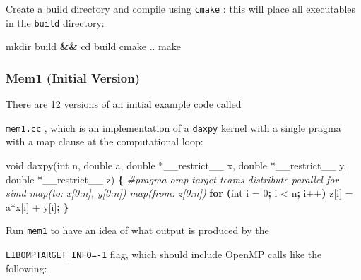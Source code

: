 \documentclass[
]{article}
\let\oldtexttt\texttt
\renewcommand{\texttt}[1]{
  \colorbox{Light}{\oldtexttt{#1}}
}
\newenvironment{Shaded}{}{}
\newcommand{\BuiltInTok}[1]{#1}
\newcommand{\CommentTok}[1]{\textcolor[rgb]{0.38,0.63,0.69}{\textit{#1}}}
\newcommand{\ExtensionTok}[1]{#1}
\newcommand{\FunctionTok}[1]{\textcolor[rgb]{0.02,0.16,0.49}{#1}}
\newcommand{\KeywordTok}[1]{\textcolor[rgb]{0.00,0.44,0.13}{\textbf{#1}}}
\newcommand{\NormalTok}[1]{#1}
\newcommand{\OperatorTok}[1]{\textcolor[rgb]{0.40,0.40,0.40}{#1}}
\begin{document}
Create a build directory and compile using \texttt{cmake}: this will
place all executables in the \texttt{build} directory:

\begin{Shaded}
\begin{Highlighting}[]
\FunctionTok{mkdir}\NormalTok{ build }\KeywordTok{\&\&} \BuiltInTok{cd}\NormalTok{ build}
\FunctionTok{cmake}\NormalTok{ ..}
\FunctionTok{make} 
\end{Highlighting}
\end{Shaded}

\hypertarget{mem1-initial-version}{%
\subsubsection{Mem1 (Initial Version)}\label{mem1-initial-version}}

There are 12 versions of an initial example code called
\texttt{mem1.cc}, which is an implementation of a \texttt{daxpy} kernel
with a single pragma with a map clause at the computational loop:

\begin{Shaded}
\begin{Highlighting}[]
\ExtensionTok{void}\NormalTok{ daxpy(int n, double a, double *\_\_restrict\_\_ x, double *\_\_restrict\_\_ y, double *\_\_restrict\_\_ z)}
\KeywordTok{\{}
\CommentTok{\#pragma omp target teams distribute parallel for simd map(to: x[0:n], y[0:n]) map(from: z[0:n])}
        \KeywordTok{for} \KeywordTok{(}\ExtensionTok{int}\NormalTok{ i = 0}\KeywordTok{;} \ExtensionTok{i} \OperatorTok{\textless{}}\NormalTok{ n}\KeywordTok{;} \ExtensionTok{i++}\KeywordTok{)}
                \ExtensionTok{z}\NormalTok{[i] = a*x[i] + y[i]}\KeywordTok{;}
\KeywordTok{\}}
\end{Highlighting}
\end{Shaded}

Run \texttt{mem1} to have an idea of what output is produced by the
\texttt{LIBOMPTARGET\_INFO=-1} flag, which should include OpenMP calls
like the following:
\end{document}
